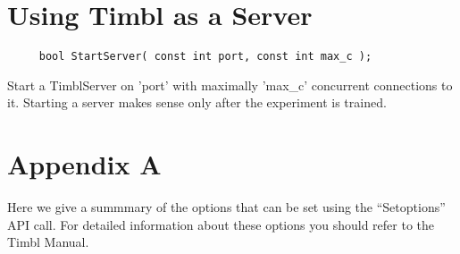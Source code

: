 \section{Using Timbl as a Server}

\begin{verbatim}
     bool StartServer( const int port, const int max_c );
\end{verbatim}

Start a TimblServer on 'port' with maximally 'max\_c' concurrent
connections to it. Starting a server makes sense only after the
experiment is trained.

\clearpage
\section{Appendix A}

Here we give a summmary of the options that can be set using the
``Setoptions'' API call. For detailed information about these options
you should refer to the Timbl Manual.

